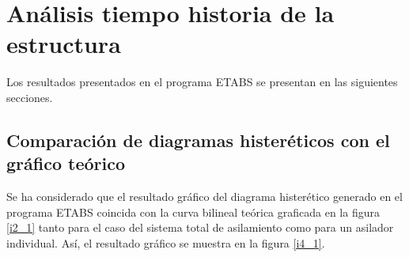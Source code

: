 \onehalfspacing
\section{Análisis tiempo historia de la estructura}
Los resultados presentados en el programa ETABS se presentan en las siguientes secciones.

\subsection{Comparación de diagramas histeréticos con el gráfico teórico}

Se ha considerado que el resultado gráfico del diagrama histerético generado en el programa ETABS coincida con la curva bilineal teórica graficada en la figura \ref{i2_1} tanto para el caso del sistema total de asilamiento como para un asilador individual. Así, el resultado gráfico se muestra en la figura \ref{i4_1}.
\newpage
